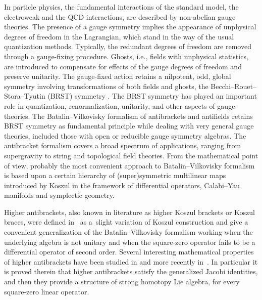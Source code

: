 \documentclass[pdftex]{sigma}
\numberwithin{equation}{section}
\begin{document}
In particle physics, the fundamental interactions of the standard model, the electroweak and the QCD interactions, are described by non-abelian gauge theories. The presence of a gauge symmetry implies the appearance of unphysical degrees of freedom in the Lagrangian, which stand in the way of the usual quantization methods. Typically, the redundant degrees of freedom are removed through a gauge-f\/ixing procedure. Ghosts, i.e., f\/ields with unphysical statistics, are introduced to compensate for ef\/fects of the gauge degrees of freedom and preserve unitarity. The gauge-f\/ixed action retains a nilpotent, odd, global symmetry involving transformations of both f\/ields and ghosts, the Becchi--Rouet--Stora--Tyutin (BRST) symmetry \cite{Becchi:1974xu, Becchi:1974md, Becchi:1975nq, Tyutin:1975qk}. The BRST symmetry has played an important role in quantization, renormalization, unitarity, and other aspects of gauge theories. The Batalin--Vilkovisky formalism of antibrackets and antif\/ields \cite{Batalin:1981jr, Batalin:1984ss, Batalin:1985qj,getzler94} retains BRST symmetry as fundamental principle while dealing with very general gauge theories, included those with open or reducible gauge symmetry algebras. The antibracket formalism covers a broad spectrum of applications, ranging from supergravity to string and topological f\/ield theories. From the mathematical point of view, probably the most convenient approach to Batalin--Vilkovisky formalism is based upon a certain hierarchy of (super)symmetric multilinear maps introduced by Koszul \cite{koszul85} in the framework of dif\/ferential operators, Calabi--Yau manifolds and symplectic geometry.

Higher antibrackets, also known in literature as higher Koszul brackets or Koszul braces, were def\/ined in~\cite{akman, alfaro} as a~slight variation of Koszul construction and give a convenient generalization of the Batalin--Vilkovisky formalism working when the underlying algebra is not unitary and when the square-zero operator fails to be a dif\/ferential operator of second order. Several interesting mathematical properties of higher antibrackets have been studied in \cite{BDA,kravchenko2000} and more recently in~\cite{markl2, markl1}. In particular it is proved therein that higher antibrackets satisfy the generalized Jacobi identities, and then they provide a structure of strong homotopy Lie algebra, for every square-zero linear operator.
\end{document}

